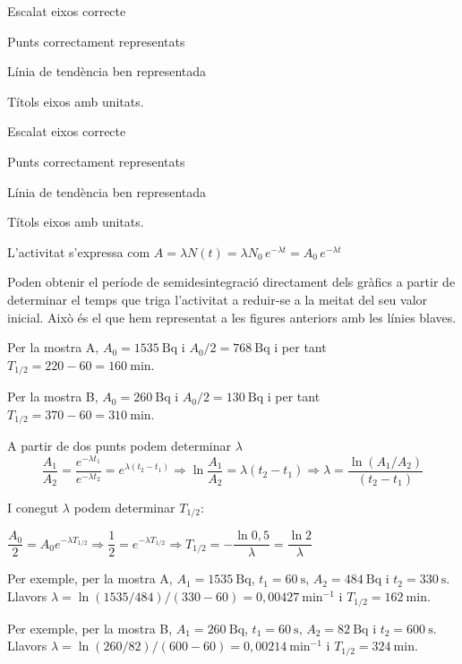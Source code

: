 \begin{solapartat}

 Escalat eixos correcte

 Punts correctament representats

 Línia de tendència ben representada

 Títols eixos amb unitats.


 Escalat eixos correcte

 Punts correctament representats

 Línia de tendència ben representada

 Títols eixos amb unitats.
\end{solapartat}

\begin{solapartat}
 L'activitat s'expressa com $A = \lambda N(t) = \lambda N_0\,e^{-\lambda t} = A_0\,e^{-\lambda t}$

 Poden obtenir el període de semidesintegració directament dels gràfics a partir de determinar el temps que triga l'activitat a reduir-se a la meitat del seu valor inicial. Això és el que hem representat a les figures anteriors amb les línies blaves.

 Per la mostra A, $A_0 = 1535\ \mathrm{Bq}$ i $A_0/2 = 768\ \mathrm{Bq}$ i per tant $T_{1/2} = 220-60 = 160\ \mathrm{min}$.

 Per la mostra B, $A_0 = 260\ \mathrm{Bq}$ i $A_0/2 = 130\ \mathrm{Bq}$ i per tant $T_{1/2} = 370-60 = 310\ \mathrm{min}$.


 A partir de dos punts podem determinar $\lambda$
\[ \frac{A_1}{A_2} = \frac{e^{-\lambda t_1}}{e^{-\lambda t_2}} = e^{\lambda(t_2-t_1)} \Rightarrow \ln\frac{A_1}{A_2} = \lambda(t_2-t_1) \Rightarrow \lambda = \frac{\ln(A_1/A_2)}{(t_2-t_1)} \]

I conegut $\lambda$ podem determinar $T_{1/2}$:

 $\dfrac{A_0}{2} = A_0 e^{-\lambda T_{1/2}} \Longrightarrow \dfrac{1}{2} = e^{-\lambda T_{1/2}} \Longrightarrow T_{1/2} = -\dfrac{\ln 0,5}{\lambda} = \dfrac{\ln 2}{\lambda}$

 Per exemple, per la mostra A, $A_1 = 1535\ \mathrm{Bq}$, $t_1 = 60\ \mathrm{s}$, $A_2 = 484\ \mathrm{Bq}$ i $t_2 = 330\ \mathrm{s}$.
Llavors $\lambda = \ln(1535/484)/(330-60) = 0,00427\ \mathrm{min}^{-1}$ i $T_{1/2} = 162\ \mathrm{min}$.

 Per exemple, per la mostra B, $A_1 = 260\ \mathrm{Bq}$, $t_1 = 60\ \mathrm{s}$, $A_2 = 82\ \mathrm{Bq}$ i $t_2 = 600\ \mathrm{s}$.
Llavors $\lambda = \ln(260/82)/(600-60) = 0,00214\ \mathrm{min}^{-1}$ i $T_{1/2} = 324\ \mathrm{min}$.
\end{solapartat}
